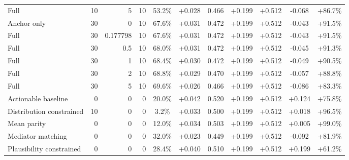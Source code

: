 \begin{table}[htbp]
\begin{tabular}{lrrrccccccc}
Full & 10 & 5 & 10 & 53.2\% & +0.028 & 0.466 & +0.199 & +0.512 & -0.068 & +86.7\% \\
Anchor only & 30 & 0 & 10 & 67.6\% & +0.031 & 0.472 & +0.199 & +0.512 & -0.043 & +91.5\% \\
Full & 30 & 0.177798 & 10 & 67.6\% & +0.031 & 0.472 & +0.199 & +0.512 & -0.043 & +91.5\% \\
Full & 30 & 0.5 & 10 & 68.0\% & +0.031 & 0.472 & +0.199 & +0.512 & -0.045 & +91.3\% \\
Full & 30 & 1 & 10 & 68.4\% & +0.030 & 0.472 & +0.199 & +0.512 & -0.049 & +90.5\% \\
Full & 30 & 2 & 10 & 68.8\% & +0.029 & 0.470 & +0.199 & +0.512 & -0.057 & +88.8\% \\
Full & 30 & 5 & 10 & 69.6\% & +0.026 & 0.466 & +0.199 & +0.512 & -0.086 & +83.3\% \\
Actionable baseline & 0 & 0 & 0 & 20.0\% & +0.042 & 0.520 & +0.199 & +0.512 & +0.124 & +75.8\% \\
Distribution constrained & 10 & 0 & 0 & 3.2\% & +0.033 & 0.500 & +0.199 & +0.512 & +0.018 & +96.5\% \\
Mean parity & 0 & 0 & 0 & 12.0\% & +0.034 & 0.503 & +0.199 & +0.512 & +0.005 & +99.0\% \\
Mediator matching & 0 & 0 & 0 & 32.0\% & +0.023 & 0.449 & +0.199 & +0.512 & -0.092 & +81.9\% \\
Plausibility constrained & 0 & 0 & 0 & 28.4\% & +0.040 & 0.510 & +0.199 & +0.512 & +0.199 & +61.2\% \\
\bottomrule
\end{tabular}
\end{table}